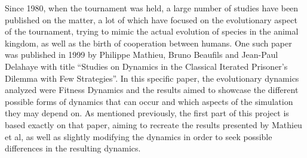 Since 1980, when the tournament was held, a large number of studies have been published on the matter, a lot of which have focused on the evolutionary aspect of the tournament, trying to mimic the actual evolution of species in the animal kingdom, as well as the birth of cooperation between humans. One such paper was published in 1999 by Philippe Mathieu, Bruno Beaufils and Jean-Paul Delahaye with title ``Studies on Dynamics in the Classical Iterated Prisoner's Dilemma with Few Strategies''\cite{mathieu1999}. In this specific paper, the evolutionary dynamics analyzed were Fitness Dynamics and the results aimed to showcase the different possible forms of dynamics that can occur and which aspects of the simulation they may depend on. As mentioned previously, the first part of this project is based exactly on that paper, aiming to recreate the results presented by Mathieu et al, as well as slightly modifying the dynamics in order to seek possible differences in the resulting dynamics.